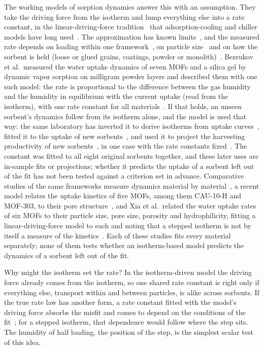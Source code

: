 \documentclass[12pt]{article}
\begin{document}
The working models of sorption dynamics answer this with an assumption. They take the driving force from the
isotherm and lump everything else into a rate constant, in the linear-driving-force
tradition~\cite{Glueckauf1955Theory,Sircar2000Why} that adsorption-cooling and chiller models have long
used~\cite{Sakoda1984Fundamental,Chua2004Transient}. The approximation has known limits~\cite{Raymond2011Intraparticle},
and the measured rate depends on loading within one framework~\cite{Hossain2019Kinetics}, on particle
size~\cite{Guo2023Universal} and on how the sorbent is held (loose or glued grains, coatings, powder or
monolith)~\cite{Solovyeva2023Water,Li2025Atmospheric}.
Bezrukov et al.\ measured the water uptake dynamics of seven MOFs and a silica gel by dynamic vapor sorption on
milligram powder layers and described them with one such model: the rate is proportional to the difference between
the gas humidity and the humidity in equilibrium with the current uptake (read from the isotherm), with one rate
constant for all materials~\cite{Bezrukov2023Regeneration}. If that holds, an unseen sorbent's dynamics follow from
its isotherm alone, and the model is used that way: the same laboratory has inverted it to derive isotherms from
uptake curves~\cite{Bezrukov2024Rapid}, fitted it to the uptake of new sorbents~\cite{Eaby2025Ultramicroporous,
Shabangu2025One}, and used it to project the harvesting productivity of new
sorbents~\cite{Eaby2025Ultramicroporous,Gao2026Molecular,Kong2026Regeneration}, in one case with the rate constants
fixed~\cite{Gao2026Molecular}. The constant was fitted to all eight original sorbents together, and these later uses
are in-sample fits or projections; whether it predicts the uptake of a sorbent left out of the fit has not been tested
against a criterion set in advance. Comparative studies of the same frameworks measure dynamics material by
material~\cite{Velte2023Adsorption,AbuElMaaty2024Kinetics}, a recent model relates the uptake kinetics of five MOFs,
among them CAU-10-H and MOF-303, to their pore structure~\cite{Ma2025Microscopic}, and Xia et al.\ related the water uptake rates of six MOFs
to their particle size, pore size, porosity and hydrophilicity, fitting a linear-driving-force model to each and
noting that a stepped isotherm is not by itself a measure of the kinetics~\cite{Xia2025Relationship}. Each of these
studies fits every material separately; none of them tests whether an isotherm-based model predicts the dynamics of a
sorbent left out of the fit.

Why might the isotherm set the rate? In the isotherm-driven model the driving force already comes from the isotherm,
so one shared rate constant is right only if everything else, transport within and between particles, is alike across
sorbents. If the true rate law has another form, a rate constant fitted with the model's driving force absorbs the
misfit and comes to depend on the conditions of the fit~\cite{Huang2018Model}; for a stepped isotherm, that
dependence would follow where the step sits. The humidity of half loading, the position of the step, is the simplest
scalar test of this idea.
\end{document}
